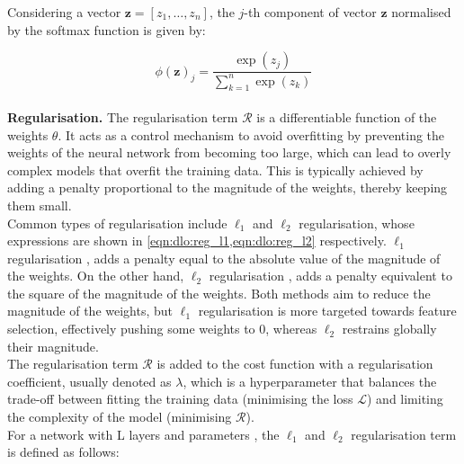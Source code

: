 Considering a vector $\mathbf{z} = [z_1, \dots, z_n]$, the $j$-th component of
vector $\mathbf{z}$ normalised by the softmax function is given by: 

\begin{equation}
  \label{eqn:dlo:softmax}
  \phi(\mathbf{z})_j = \frac{\exp(z_j)}{\displaystyle\sum_{k=1}^{n} \exp(z_k)}
\end{equation}\\

\noindent \textbf{Regularisation.} The regularisation term $\mathcal{R}$ is a
differentiable function of the weights $\theta$. It acts as a control mechanism
to avoid overfitting by preventing the weights of the neural network from
becoming too large, which can lead to overly complex models that overfit the
training data. This is typically achieved by adding a penalty proportional to
the magnitude of the weights, thereby keeping them small.\\

Common types of regularisation include $\ell_1$ and $\ell_2$ regularisation,
whose expressions are shown in \cref{eqn:dlo:reg_l1,eqn:dlo:reg_l2}
respectively. $\ell_1$ regularisation \cite{tibshirani1996regression}, adds a
penalty equal to the absolute value of the magnitude of the weights. On the
other hand, $\ell_2$ regularisation \cite{hoerl1970ridge}, adds a penalty
equivalent to the square of the magnitude of the weights. Both methods aim to
reduce the magnitude of the weights, but $\ell_1$ regularisation is more
targeted towards feature selection, effectively pushing some weights to $0$,
whereas $\ell_2$ restrains globally their magnitude.\\

The regularisation term $\mathcal{R}$ is added to the cost function with a
regularisation coefficient, usually denoted as $\lambda$, which is a
hyperparameter that balances the trade-off between fitting the training data
(minimising the loss $\mathcal{L}$) and limiting the complexity of the model
(minimising $\mathcal{R}$).\\

For a network with L layers and parameters \DIFdelbegin {}\DIFdelend \DIFaddbegin {}\DIFaddend , the $\ell_1$ and $\ell_2$ regularisation term is defined as
follows:\\


